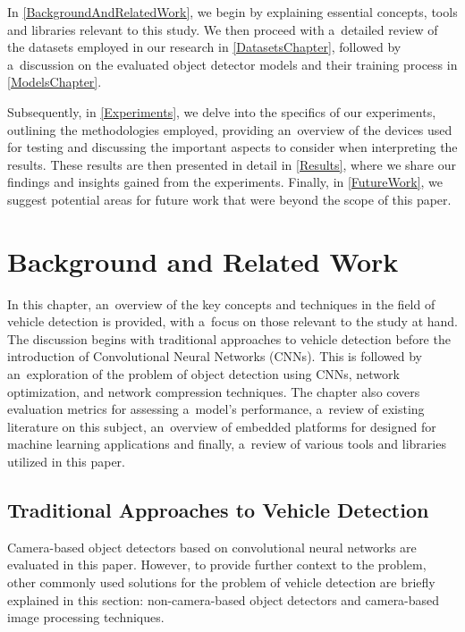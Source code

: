 In \autoref{BackgroundAndRelatedWork}, we begin by explaining essential
concepts, tools and libraries relevant to this study. We then proceed with
a~detailed review of the datasets employed in our research in
\autoref{DatasetsChapter}, followed by a~discussion on the evaluated object
detector models and their training process in \autoref{ModelsChapter}.

Subsequently, in \autoref{Experiments}, we delve into the specifics of our
experiments, outlining the methodologies employed, providing an~overview of the
devices used for testing and discussing the important aspects to consider when
interpreting the results. These results are then presented in detail in
\autoref{Results}, where we share our findings and insights gained from the
experiments. Finally, in \autoref{FutureWork}, we suggest potential areas for
future work that were beyond the scope of this paper.


\chapter{Background and Related Work}
\label{BackgroundAndRelatedWork}


In this chapter, an~overview of the key concepts and techniques in the field of
vehicle detection is provided, with a~focus on those relevant to the study at
hand. The discussion begins with traditional approaches to vehicle detection
before the introduction of Convolutional Neural Networks (CNNs). This is
followed by an~exploration of the problem of object detection using CNNs,
network optimization, and network compression techniques. The chapter also
covers evaluation metrics for assessing a~model's performance, a~review of
existing literature on this subject, an~overview of embedded platforms for
designed for machine learning applications and finally, a~review of various
tools and libraries utilized in this paper.


\section{Traditional Approaches to Vehicle Detection}

Camera-based object detectors based on convolutional neural networks are
evaluated in this paper. However, to provide further context to the problem,
other commonly used solutions for the problem of vehicle detection are briefly
explained in this section: non-camera-based object detectors and
camera-based image processing techniques.


